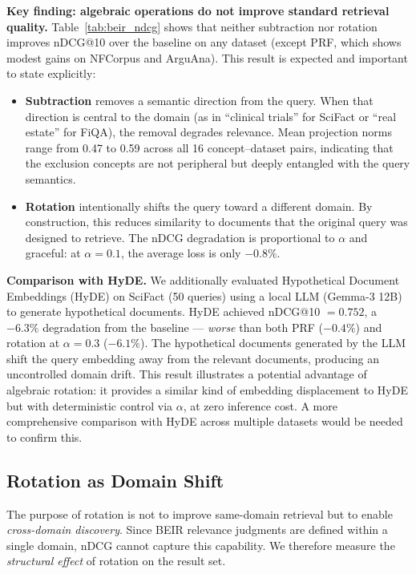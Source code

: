 \documentclass{article}
\begin{document}
\textbf{Key finding: algebraic operations do not improve standard retrieval quality.} Table~\ref{tab:beir_ndcg} shows that neither subtraction nor rotation improves nDCG@10 over the baseline on any dataset (except PRF, which shows modest gains on NFCorpus and ArguAna). This result is expected and important to state explicitly:

\begin{itemize}
\item \textbf{Subtraction} removes a semantic direction from the query. When that direction is central to the domain (as in ``clinical trials'' for SciFact or ``real estate'' for FiQA), the removal degrades relevance. Mean projection norms range from 0.47 to 0.59 across all 16 concept--dataset pairs, indicating that the exclusion concepts are not peripheral but deeply entangled with the query semantics.

\item \textbf{Rotation} intentionally shifts the query toward a different domain. By construction, this reduces similarity to documents that the original query was designed to retrieve. The nDCG degradation is proportional to $\alpha$ and graceful: at $\alpha = 0.1$, the average loss is only $-0.8\%$.
\end{itemize}

\textbf{Comparison with HyDE.} We additionally evaluated Hypothetical Document Embeddings (HyDE) \cite{gao2023hyde} on SciFact (50 queries) using a local LLM (Gemma-3 12B) to generate hypothetical documents. HyDE achieved nDCG@10 $= 0.752$, a $-6.3\%$ degradation from the baseline --- \emph{worse} than both PRF ($-0.4\%$) and rotation at $\alpha = 0.3$ ($-6.1\%$). The hypothetical documents generated by the LLM shift the query embedding away from the relevant documents, producing an uncontrolled domain drift. This result illustrates a potential advantage of algebraic rotation: it provides a similar kind of embedding displacement to HyDE but with deterministic control via $\alpha$, at zero inference cost. A more comprehensive comparison with HyDE across multiple datasets would be needed to confirm this.

\subsection{Rotation as Domain Shift}

The purpose of rotation is not to improve same-domain retrieval but to enable \emph{cross-domain discovery}. Since BEIR relevance judgments are defined within a single domain, nDCG cannot capture this capability. We therefore measure the \emph{structural effect} of rotation on the result set.
\end{document}
